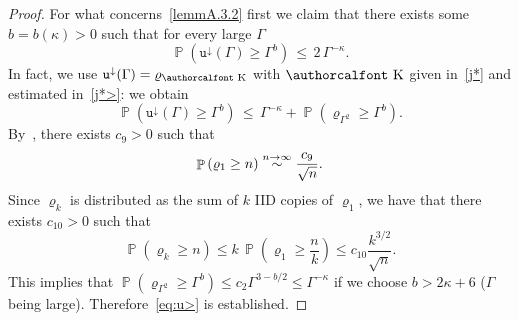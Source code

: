 \documentclass[10pt]{amsart}
\theoremstyle{definition}\newtheorem{defi}[theo]{Definition}\newtheorem{rema}[theo]{Remark}\newtheorem{exam}[theo]{Example}\newtheorem{exem}[theo]{Example}\newtheorem{nota}[theo]{Notation}
\renewcommand{\mathcal}[1]{\text{\authorcalfont #1}}
\renewcommand*\ss{\mathtt{u}}
\newcommand{\tudown}{\ss^\downarrow}
\DeclareMathOperator{\p}{\mathbb{P}}
\newcommand{\clK}{\mathcal{K}}
\renewcommand*{\to}{\mathchoice{\longrightarrow}{\rightarrow}{\rightarrow}{\rightarrow}}
\begin{document}
\begin{proof}
For what concerns~\eqref{lemmA.3.2} first we claim that there exists some $b=b(\kappa)>0$ such that for every large $\Gamma$
\begin{equation}
\p\left(\tudown(\Gamma)\ge \Gamma^b\right) \,\le \, 2\, \Gamma^{-\kappa}.\label{eq:u>}
\end{equation}
In fact, we use $\tudown(\Gamma)=\varrho_{\clK}$ with ${\clK}$ given in~\eqref{j*} and estimated in~\eqref{j*>}: we obtain
\begin{equation}
\p\left(\tudown(\Gamma)\ge \Gamma^b\right) \,\le \, \Gamma^{-\kappa} + \p\left(\varrho_{\Gamma^2} \ge \Gamma^b\right).\label{eq:u>1}
\end{equation}
By~\cite[Theorem~4.6]{kersting-vatutin}, there exists $c_{9}>0$ such that
\begin{equation}
\p\left(\varrho_1 \ge n\right) \stackrel{n \to \infty}\sim \frac{c_{9}}{\sqrt{n}}.
\end{equation}
Since $\varrho_k$ is distributed as the sum of $k$ IID copies of $\varrho_1$, we have that there exists $c_{10}>0$ such that
\begin{equation}
\p\left(\varrho_k \ge n\right) \le k\, \p\left(\varrho_1 \ge \frac{n}{k}\right)\le c_{10} \frac{k^{3/2}}{\sqrt{n}}.
\end{equation}
This implies that $\p(\varrho_{\Gamma^2} \ge \Gamma^b) \le c_{2} \Gamma^{3-b/2} \le \Gamma^{-\kappa}$ if we choose {{ $b> 2\kappa+6$}} ($\Gamma$ being large). Therefore~\eqref{eq:u>} is established.




\end{proof}
\end{document}
